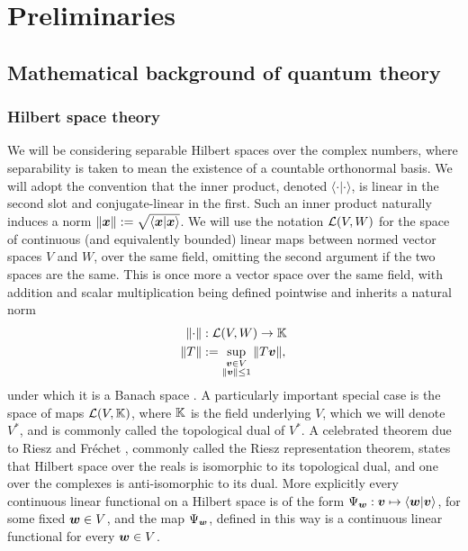 \let\textcircled=\pgftextcircled
\chapter{Preliminaries}
\label{chap:prelim}


\bigskip

\section{Mathematical background of quantum theory}

\subsection{Hilbert space theory}

We will be considering separable Hilbert spaces over the complex numbers, where separability is taken to mean the existence of a countable orthonormal basis. We will adopt the convention that the inner product, denoted $\langle\cdot|\cdot\rangle$, is linear in the second slot and conjugate-linear in the first. Such an inner product naturally induces a norm ${\left\lVert{\bm{x}}\right\rVert} := \sqrt{\langle \bm{x}| \bm{x}\rangle}$. We will use the notation $\bops[V][W]$ for the space of continuous (and equivalently bounded) linear maps between normed vector spaces $V$ and $W$, over the same field, omitting the second argument if the two spaces are the same. This is once more a vector space over the same field, with addition and scalar multiplication being defined pointwise and inherits a natural norm 
\begin{align}
  \norm{\cdot}&:\bops[V][W]\to \K\\
  \norm{T} &\defeq \sup_{\substack{\bov\in V \\ \norm{\bov}\leq 1}}\norm{T\bov}, \label{eqn:operator-norm}
\end{align}
under which it is a Banach space . A particularly important special case is the space of maps $\bops[V][\K]$, where $\mathbb{K}$ is the field underlying $V$, which we will denote $V^*$, and is commonly called the topological dual of $V^*$. A celebrated theorem due to Riesz \cite{riesz-representation-riesz} and Fr{\'e}chet \cite{riesz-representation-frechet}, commonly called the Riesz representation theorem, states that Hilbert space over the reals is isomorphic to its topological dual, and one over the complexes is anti-isomorphic to its dual. More explicitly every continuous linear functional on a Hilbert space is of the form $\Psi_{\bm{w}} :\bm{v}\mapsto \langle{\bm{w}} |\bm{v}\rangle$, for some fixed $\bm{w}\in V$, and the map $\Psi_{\bm{w}}$, defined in this way is a continuous linear functional for every $\bm{w}\in V$.

